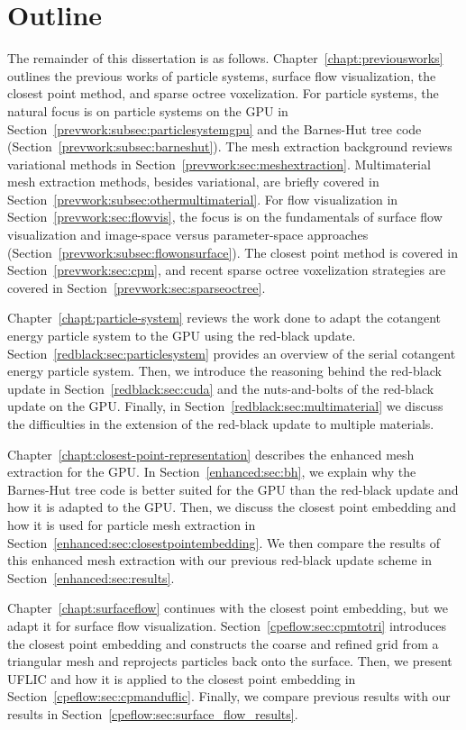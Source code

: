 \section{Outline}
The remainder of this dissertation is as follows. Chapter~\ref{chapt:previousworks} outlines the previous works of particle systems, surface flow visualization, the closest point method, and sparse octree voxelization. For particle systems, the natural focus is on particle systems on the GPU in Section~\ref{prevwork:subsec:particlesystemgpu} and the Barnes-Hut tree code (Section~\ref{prevwork:subsec:barneshut}). The mesh extraction background reviews variational methods in Section~\ref{prevwork:sec:meshextraction}. Multimaterial mesh extraction methods, besides variational, are briefly covered in Section~\ref{prevwork:subsec:othermultimaterial}. For flow visualization in Section~\ref{prevwork:sec:flowvis}, the focus is on the fundamentals of surface flow visualization and image-space versus parameter-space approaches (Section~\ref{prevwork:subsec:flowonsurface}). The closest point method is covered in Section~\ref{prevwork:sec:cpm}, and recent sparse octree voxelization strategies are covered in Section~\ref{prevwork:sec:sparseoctree}.

Chapter~\ref{chapt:particle-system} reviews the work done to adapt the cotangent energy particle system to the GPU using the red-black update.  Section~\ref{redblack:sec:particlesystem} provides an overview of the serial cotangent energy particle system. Then, we introduce the reasoning behind the red-black update in Section~\ref{redblack:sec:cuda} and the nuts-and-bolts of the red-black update on the GPU. Finally, in Section~\ref{redblack:sec:multimaterial} we discuss the difficulties in the extension of the red-black update to multiple materials.

Chapter~\ref{chapt:closest-point-representation} describes the enhanced mesh extraction for the GPU. In Section~\ref{enhanced:sec:bh}, we explain why the Barnes-Hut tree code is better suited for the GPU than the red-black update and how it is adapted to the GPU. Then, we discuss the closest point embedding and how it is used for particle mesh extraction in Section~\ref{enhanced:sec:closestpointembedding}. We then compare the results of this enhanced mesh extraction with our previous red-black update scheme in Section~\ref{enhanced:sec:results}.

Chapter~\ref{chapt:surfaceflow} continues with the closest point embedding, but we adapt it for surface flow visualization. Section~\ref{cpeflow:sec:cpmtotri} introduces the closest point embedding and constructs the coarse and refined grid from a triangular mesh and reprojects particles back onto the surface. Then, we present UFLIC and how it is applied to the closest point embedding in Section~\ref{cpeflow:sec:cpmanduflic}. Finally, we compare previous results with our results in Section~\ref{cpeflow:sec:surface_flow_results}.

